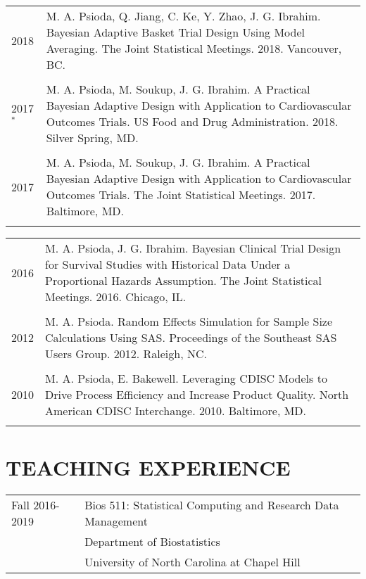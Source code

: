 \documentclass[11pt]{article}
\begin{document}
\begin{tabular}[!h]{p{2.0cm}p{13.2cm}}								
2018 &  M. A. Psioda, Q. Jiang, C. Ke, Y. Zhao, J. G. Ibrahim. Bayesian Adaptive Basket Trial Design Using
        Model Averaging. The Joint Statistical Meetings. 2018. Vancouver, BC. \\ & \\
2017$^*$ &  M. A. Psioda, M. Soukup, J. G. Ibrahim. A Practical Bayesian Adaptive Design with Application to
        Cardiovascular Outcomes Trials. US Food and Drug Administration. 2018. Silver Spring, MD. \\ & \\
2017 &  M. A. Psioda, M. Soukup, J. G. Ibrahim. A Practical Bayesian Adaptive Design with Application to
        Cardiovascular Outcomes Trials. The Joint Statistical Meetings. 2017. Baltimore, MD. \\ & \\
\end{tabular}

\begin{tabular}[!h]{p{2.0cm}p{13.2cm}}
2016 &  M. A. Psioda, J. G. Ibrahim. Bayesian Clinical Trial Design for Survival Studies with Historical 
        Data Under a Proportional Hazards Assumption. The Joint Statistical Meetings. 2016. Chicago, IL. \\ & \\
2012 &  M. A. Psioda. Random Effects Simulation for Sample Size Calculations Using SAS.
        Proceedings of the Southeast SAS Users Group. 2012. Raleigh, NC.  \\ & \\
2010 &  M. A. Psioda, E. Bakewell. Leveraging CDISC Models to Drive Process Efficiency and Increase Product Quality.
        North American CDISC Interchange. 2010. Baltimore, MD. \\ & \\
\end{tabular}

\section*{\large \bf TEACHING EXPERIENCE}
\begin{flushleft}
\begin{tabular}[!h]{p{3cm}p{12.3cm}}
Fall 2016-2019 &    Bios 511: Statistical Computing and Research Data Management \\ 
&  Department of Biostatistics\\
&  University of North Carolina at Chapel Hill\\
\end{tabular}
\end{flushleft}
\end{document}
